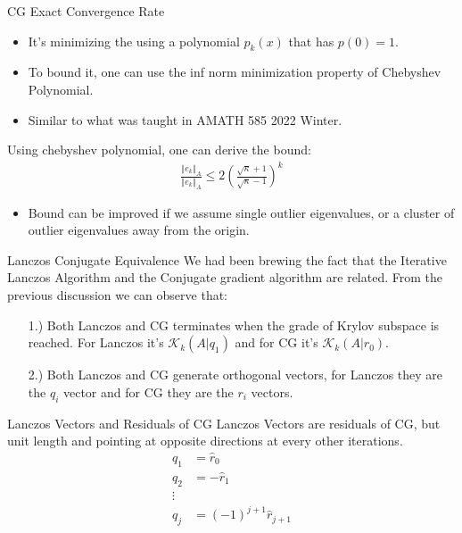 \documentclass{beamer}
\begin{document}
    \begin{frame}{CG Exact Convergence Rate}
        \begin{itemize}
            \item It's minimizing the using a polynomial $p_k(x)$ that has $p(0) = 1$. 
            \item To bound it, one can use the inf norm minimization property of Chebyshev Polynomial.
            \item Similar to what was taught in AMATH 585 2022 Winter. 
        \end{itemize}
        Using chebyshev polynomial, one can derive the bound: 
        \begin{align}
            \frac{\Vert e_k\Vert_A}{\Vert e_k\Vert_A}
            \le 2 \left(
                    \frac{\sqrt{\kappa} + 1}{\sqrt{\kappa} - 1}
            \right)^k
        \end{align}
        \begin{itemize}
            \item Bound can be improved if we assume single outlier eigenvalues, or a cluster of outlier eigenvalues away from the origin. 
        \end{itemize}
    \end{frame}
    \begin{frame}{Lanczos Conjugate Equivalence}
        We had been brewing the fact that the Iterative Lanczos Algorithm and the Conjugate gradient algorithm are related. From the previous discussion we can observe that: 
        \begin{enumerate}
            \item [1.)] Both Lanczos and CG terminates when the grade of Krylov subspace is reached. For Lanczos it's $\mathcal K_k(A|q_1)$ and for CG it's $\mathcal K_k(A|r_0)$.
            \item [2.)] Both Lanczos and CG generate orthogonal vectors, for Lanczos they are the $q_i$ vector and for CG they are the $r_i$ vectors. 
        \end{enumerate}
    \end{frame}
    \begin{frame}{Lanczos Vectors and Residuals of CG}
        Lanczos Vectors are residuals of CG, but unit length and pointing at opposite directions at every other iterations. 
        \begin{align}
                q_1 &= \hat r_0\\
                q_2 &= -\hat r_1
                \\
                \vdots
                \\
                q_j &= (-1)^{j + 1}\hat r_{j + 1}
        \end{align}
    \end{frame}
\end{document}
